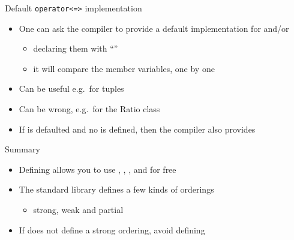 \begin{frame}[fragile]
  \begin{block}{Default \texttt{operator<=>} implementation}
    \begin{itemize}
    \item One can ask the compiler to provide a default implementation for  and/or 
      \begin{itemize}
        \item declaring them with ``''
        \item it will compare the member variables, one by one
      \end{itemize}
    \item Can be useful e.g.\ for tuples
    \item Can be wrong, e.g.\ for the Ratio class
    \item If  is defaulted and no  is defined, then the compiler also provides 
    \end{itemize}
  \end{block}
\end{frame}

\begin{frame}[fragile]
  \begin{block}{Summary}
    \begin{itemize}
      \item Defining  allows you to use , , , and  for free
      \item The standard library defines a few kinds of orderings
        \begin{itemize}
          \item strong, weak and partial
        \end{itemize}
      \item If  does not define a strong ordering, avoid defining 
    \end{itemize}
  \end{block}
\end{frame}
